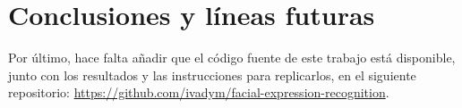 \chapter{Conclusiones y líneas futuras} \label{Chapter:7}


Por último, hace falta añadir que el código fuente de este trabajo está disponible, junto con los resultados y las instrucciones para replicarlos, en el siguiente repositorio: \url{https://github.com/ivadym/facial-expression-recognition}.